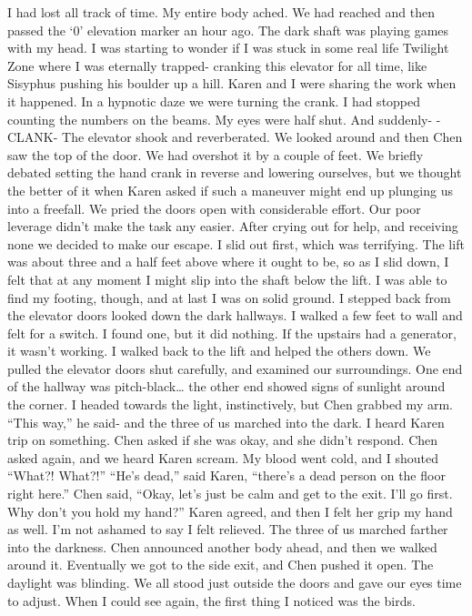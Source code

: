 \documentclass[a4paper]{article}
\begin{document}
I had lost all track of time. My entire body ached. We had reached and then passed the ‘0’ elevation marker an hour ago. The dark shaft was playing games with my head. I was starting to wonder if I was stuck in some real life Twilight Zone where I was eternally trapped- cranking this elevator for all time, like Sisyphus pushing his boulder up a hill.
Karen and I were sharing the work when it happened. In a hypnotic daze we were turning the crank. I had stopped counting the numbers on the beams. My eyes were half shut. And suddenly-
-CLANK-
The elevator shook and reverberated. We looked around and then Chen saw the top of the door. We had overshot it by a couple of feet. We briefly debated setting the hand crank in reverse and lowering ourselves, but we thought the better of it when Karen asked if such a maneuver might end up plunging us into a freefall.
We pried the doors open with considerable effort. Our poor leverage didn’t make the task any easier. After crying out for help, and receiving none we decided to make our escape.
I slid out first, which was terrifying. The lift was about three and a half feet above where it ought to be, so as I slid down, I felt that at any moment I might slip into the shaft below the lift. I was able to find my footing, though, and at last I was on solid ground.
I stepped back from the elevator doors looked down the dark hallways. I walked a few feet to wall and felt for a switch. I found one, but it did nothing. If the upstairs had a generator, it wasn’t working.
I walked back to the lift and helped the others down. We pulled the elevator doors shut carefully, and examined our surroundings.
One end of the hallway was pitch-black… the other end showed signs of sunlight around the corner. I headed towards the light, instinctively, but Chen grabbed my arm. “This way,” he said- and the three of us marched into the dark.
I heard Karen trip on something. Chen asked if she was okay, and she didn’t respond. Chen asked again, and we heard Karen scream.
My blood went cold, and I shouted “What?! What?!”
“He’s dead,” said Karen, “there’s a dead person on the floor right here.”
Chen said, “Okay, let’s just be calm and get to the exit. I’ll go first. Why don’t you hold my hand?”
Karen agreed, and then I felt her grip my hand as well. I’m not ashamed to say I felt relieved.
The three of us marched farther into the darkness. Chen announced another body ahead, and then we walked around it. Eventually we got to the side exit, and Chen pushed it open.
The daylight was blinding. We all stood just outside the doors and gave our eyes time to adjust. When I could see again, the first thing I noticed was the birds.
\end{document}
